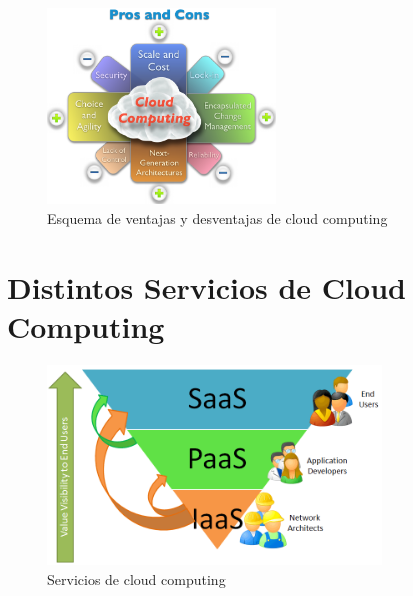 \documentclass[12pt,a4paper]{article}
\begin{document}
\begin{figure}[h!]
 \centering
 \includegraphics[width=0.54\textwidth]{cc_pros.png}
\caption[Pros Cloud Computing]{Esquema de ventajas y desventajas de cloud computing}
\end{figure}\par


\section{Distintos Servicios de Cloud Computing}

\begin{figure}[h!]
 \centering
 \includegraphics[width=0.79\textwidth]{SaStoIaS.png}
\caption[Servicios de Cloud Computing]{Servicios de cloud computing}
\end{figure}
\end{document}
